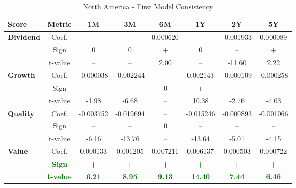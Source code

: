 \documentclass[11pt,english,a4paper,hidelinks]{book}
\begin{document}
\begin{table}[H]
    \centering
    \caption{North America - First Model Consistency}
    \begin{tabular}{lccccccc}
        \toprule
        \textbf{Score} & \textbf{Metric} & \textbf{1M} & \textbf{3M} & \textbf{6M} & \textbf{1Y} & \textbf{2Y} & \textbf{5Y} \\
        \midrule
        \multirow{3}{*}{\textbf{Dividend}}
            & Coef.   & -- & -- & 0.000620 & -- & -0.001933 & 0.000089 \\
            & Sign    & 0 & 0 & + & 0 & – & + \\
            & t-value & -- & -- & 2.00 & -- & -11.60 & 2.22 \\
        \cmidrule{1-8}
        \multirow{3}{*}{\textbf{Growth}}
            & Coef.   & -0.000038 & -0.002244 & -- & 0.002143 & -0.000109 & -0.000258 \\
            & Sign    & – & – & 0 & + & – & – \\
            & t-value & -1.98 & -6.68 & -- & 10.38 & -2.76 & -4.03 \\
        \cmidrule{1-8}
        \multirow{3}{*}{\textbf{Quality}}
            & Coef.   & -0.003752 & -0.019694 & -- & -0.015246 & -0.000893 & -0.001066 \\
            & Sign    & – & – & 0 & – & – & – \\
            & t-value & -6.16 & -13.76 & -- & -13.64 & -5.01 & -4.15 \\
        \cmidrule{1-8}
        \multirow{3}{*}{\textbf{Value}}
            & Coef.   & 0.000133 & 0.001205 & 0.007211 & 0.006137 & 0.000503 & 0.000722 \\
            & \textbf{\textcolor{green}{Sign}} & \textbf{\textcolor{green}{+}} & \textbf{\textcolor{green}{+}} & \textbf{\textcolor{green}{+}} & \textbf{\textcolor{green}{+}} & \textbf{\textcolor{green}{+}} & \textbf{\textcolor{green}{+}} \\
            & \textbf{\textcolor{green}{t-value}} & \textbf{\textcolor{green}{6.21}} & \textbf{\textcolor{green}{8.95}} & \textbf{\textcolor{green}{9.13}} & \textbf{\textcolor{green}{14.40}} & \textbf{\textcolor{green}{7.44}} & \textbf{\textcolor{green}{6.46}} \\
        \bottomrule
    \end{tabular}
    \label{tab:usa_first_model_consistency}
\end{table}
\end{document}
